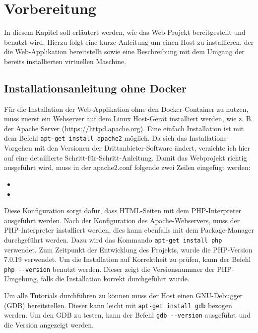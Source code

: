 \chapter{Vorbereitung}
In diesem Kapitel soll erläutert werden, wie das Web-Projekt bereitgestellt und benutzt wird. Hierzu folgt eine kurze Anleitung um einen Host zu installieren, der die Web-Applikation bereitstellt sowie eine Beschreibung mit dem Umgang der bereits installierten virtuellen Maschine.

\section{Installationsanleitung ohne Docker}
\label{sec:Install}

Für die Installation der Web-Applikation ohne den Docker-Container zu nutzen, muss zuerst ein Webserver auf dem Linux Host-Gerät installiert werden, wie z. B. der Apache Server (\url{https://httpd.apache.org}). Eine einfach Installation ist mit dem Befehl \colorbox{altgray}{\lstinline|apt-get install apache2|} möglich. Da sich das Installations-Vorgehen mit den Versionen der Drittanbieter-Software ändert, verzichte ich hier auf eine detaillierte Schritt-für-Schritt-Anleitung. Damit das Webprojekt richtig ausgeführt wird, muss in der apache2.conf folgende zwei Zeilen eingefügt werden:\medskip

\begin{itemize}
	\item {}
	\item {}\medskip
\end{itemize}
	
Diese Konfiguration sorgt dafür, dass HTML-Seiten mit dem PHP-Interpreter ausgeführt werden. Nach der Konfiguration des Apache-Webservers, muss der PHP-Interpreter installiert werden, dies kann ebenfalls mit dem Package-Manager durchgeführt werden. Dazu wird das Kommando \colorbox{altgray}{\lstinline|apt-get install php|} verwendet. Zum Zeitpunkt der Entwicklung des Projekts, wurde die PHP-Version 7.0.19 verwendet. Um die Installation auf Korrektheit zu prüfen, kann der Befehl \colorbox{altgray}{\lstinline|php --version|} benutzt werden. Dieser zeigt die Versionsnummer der PHP-Umgebung, falls die Installation korrekt durchgeführt wurde.\medskip

Um alle Tutorials durchführen zu können muss der Host einen GNU-Debugger (GDB) bereitstellen. Dieser kann leicht mit  \colorbox{altgray}{\lstinline|apt-get install gdb|} bezogen werden. Um den GDB zu testen, kann der Befehl \colorbox{altgray}{\lstinline|gdb --version|} ausgeführt und die Version angezeigt werden.\medskip

